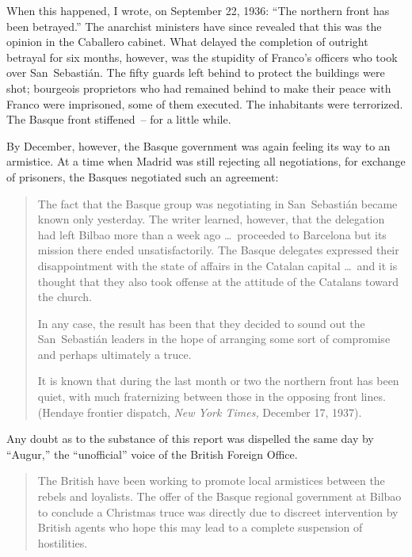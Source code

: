 When this happened, I wrote, on September 22, 1936: ``\kp The northern front has been betrayed.\kn\kn'' The anarchist ministers have since revealed that this was the opinion in the Caballero cabinet. What delayed the completion of outright betrayal for six months, however\kn, was the stupidity of Franco’s officers who took over San~Sebasti\'an. The fifty guards left behind to protect the buildings were shot; bourgeois proprietors who had remained behind to make their peace with Franco were imprisoned, some of them executed. The inhabitants were terrorized. The Basque front stiffened~-- for a little while.
\nowidow

\medskip

By December\kn, however\kn, the Basque government was again feeling its way to an armistice. At a time when Madrid was still rejecting all negotiations, for exchange of prisoners, the Basques negotiated such an agreement:

\begin{quotation}
  \indexNYT{}
  
  The fact that the Basque group was negotiating in San~Sebasti\'an became known only yesterday. The writer learned, however, that the delegation had left Bilbao more than a week ago \dots\ proceeded to Barcelona but its mission there ended unsatisfactorily. The Basque delegates expressed their disappointment with the state of affairs in the Catalan capital \dots\ and it is thought that they also took offense at the attitude of the Catalans toward the church.
  
  In any case, the result has been that they decided to sound out the San~Sebasti\'an leaders in the hope of arranging some sort of compromise and perhaps ultimately a truce.
  
  It is known that during the last month or two the northern front has been quiet, with much fraternizing between those in the opposing front lines. (Hendaye frontier dispatch, \emph{New York Times,} December 17, 1937).
\end{quotation}

Any doubt as to the substance of this report was dispelled the same day by ``Augur,\kn\kn'' the ``unofficial'' voice of the British Foreign Office.

\begin{quotation}
The British have been working to promote local armistices between the rebels and loyalists. The offer of the Basque regional government at Bilbao to conclude a Christmas truce was directly due to discreet intervention by British agents who hope this may lead to a complete suspension of hostilities.
\end{quotation}

